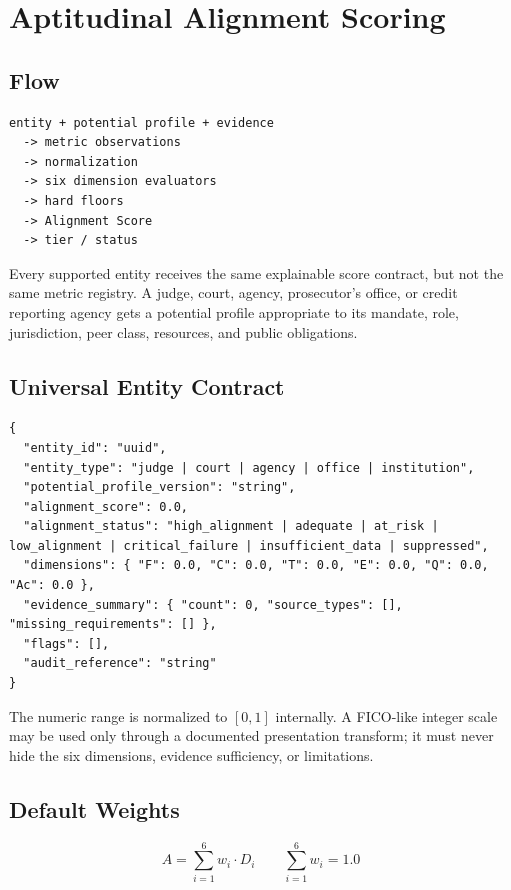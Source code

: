 \section{Aptitudinal Alignment Scoring}

\subsection{Flow}

\begin{lstlisting}
entity + potential profile + evidence
  -> metric observations
  -> normalization
  -> six dimension evaluators
  -> hard floors
  -> Alignment Score
  -> tier / status
\end{lstlisting}

Every supported entity receives the same explainable score contract, but not
the same metric registry. A judge, court, agency, prosecutor's office, or
credit reporting agency gets a potential profile appropriate to its mandate,
role, jurisdiction, peer class, resources, and public obligations.

\subsection{Universal Entity Contract}

\begin{lstlisting}
{
  "entity_id": "uuid",
  "entity_type": "judge | court | agency | office | institution",
  "potential_profile_version": "string",
  "alignment_score": 0.0,
  "alignment_status": "high_alignment | adequate | at_risk | low_alignment | critical_failure | insufficient_data | suppressed",
  "dimensions": { "F": 0.0, "C": 0.0, "T": 0.0, "E": 0.0, "Q": 0.0, "Ac": 0.0 },
  "evidence_summary": { "count": 0, "source_types": [], "missing_requirements": [] },
  "flags": [],
  "audit_reference": "string"
}
\end{lstlisting}

The numeric range is normalized to \([0,1]\) internally. A FICO-like integer
scale may be used only through a documented presentation transform; it must
never hide the six dimensions, evidence sufficiency, or limitations.

\subsection{Default Weights}

\[
A = \sum_{i=1}^{6} w_i \cdot D_i \qquad \sum_{i=1}^{6} w_i = 1.0
\]

